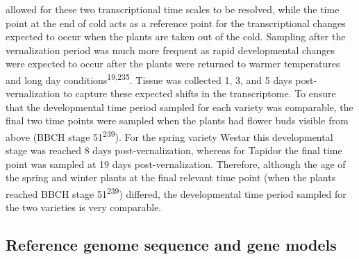 \documentclass[12pt,]{book}
\begin{document}
allowed for these two transcriptional time scales to be resolved, while
the time point at the end of cold acts as a reference point for the
transcriptional changes expected to occur when the plants are taken out
of the cold. Sampling after the vernalization period was much more
frequent as rapid developmental changes were expected to occur after the
plants were returned to warmer temperatures and long day
conditions\textsuperscript{19,235}. Tissue was collected 1, 3, and 5
days post-vernalization to capture these expected shifts in the
transcriptome. To ensure that the developmental time period sampled for
each variety was comparable, the final two time points were sampled when
the plants had flower buds visible from above (BBCH stage
51\textsuperscript{239}). For the spring variety Westar this
developmental stage was reached 8 days post-vernalization, whereas for
Tapidor the final time point was sampled at 19 days post-vernalization.
Therefore, although the age of the spring and winter plants at the final
relevant time point (when the plants reached BBCH stage
51\textsuperscript{239}) differed, the developmental time period sampled
for the two varieties is very comparable.

\subsection{Reference genome sequence and gene
models}\label{section:spring:genomegenemodels}
\end{document}
